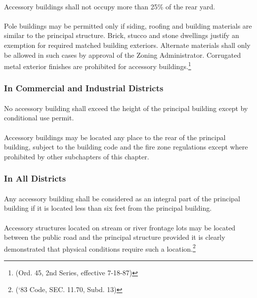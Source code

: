 \paragraph{}
Accessory buildings shall not occupy more than 25\% of the rear yard.
\paragraph{}
Pole buildings may be permitted only if siding, roofing and building materials are similar to the principal structure. Brick, stucco and stone dwellings justify an exemption for required matched building exteriors. Alternate materials shall only be allowed in such cases by approval of the Zoning Administrator. Corrugated metal exterior finishes are prohibited for accessory buildings.\footnote{(Ord. 45, 2nd Series, effective 7-18-87)}
\subsubsection{In Commercial and Industrial Districts}
\paragraph{}
No accessory building shall exceed the height of the principal building except by conditional use permit.
\paragraph{}
Accessory buildings may be located any place to the rear of the principal building, subject to the building code and the fire zone regulations except where prohibited by other subchapters of this chapter.
\subsubsection{In All Districts}
\paragraph{}
Any accessory building shall be considered as an integral part of the principal building if it is located less than six feet from the principal building.
\paragraph{}
Accessory structures located on stream or river frontage lots may be located between the public road and the principal structure provided it is clearly demonstrated that physical conditions require such a location.\footnote{(‘83 Code, SEC. 11.70, Subd. 13)}
